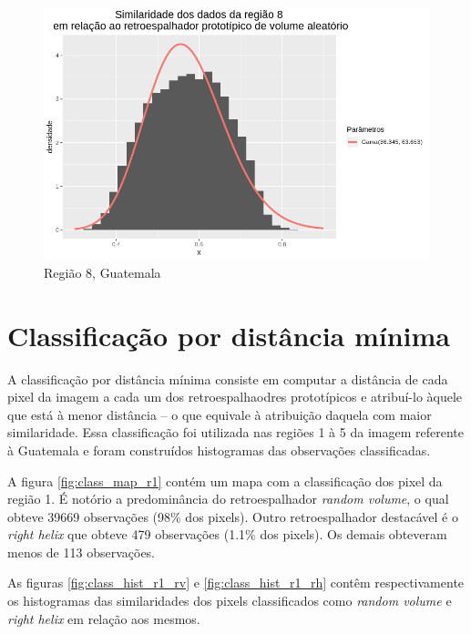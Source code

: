 \documentclass[12pt]{article}
\begin{document}
\begin{figure}[!h]
    \centering    
    \vspace{0.1\linewidth}
    \includegraphics[width = 0.95\linewidth]{../../Images/Report_18_12_17/rv_region8.png}
    \caption{Região 8, Guatemala}
    \label{fig:rv_r8}

    \vspace{0.1\linewidth}
\end{figure}

\section{Classificação por distância mínima}

A classificação por distância mínima consiste em computar a distância de cada pixel da imagem a cada um dos retroespalhaodres prototípicos e atribuí-lo àquele que está à menor distância -- o que equivale à atribuição daquela com maior similaridade. Essa classificação foi utilizada nas regiões 1 à 5 da imagem referente à Guatemala e foram construídos histogramas das observações classificadas.

A figura \ref{fig:class_map_r1} contém um mapa com a classificação dos pixel da região 1. É notório a predominância do retroespalhador \textit{random volume}, o qual obteve 39669 observações (98\% dos pixels). Outro retroespalhador destacável é o \textit{right helix} que obteve 479 observações (1.1\% dos pixels). Os demais obteveram menos de 113 observações. 

As figuras \ref{fig:class_hist_r1_rv} e \ref{fig:class_hist_r1_rh} contêm respectivamente os histogramas das similaridades dos pixels classificados como \textit{random volume} e \textit{right helix} em relação aos mesmos.
\end{document}
